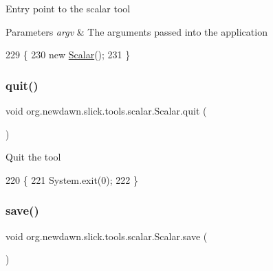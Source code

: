 Entry point to the scalar tool


\begin{DoxyParams}{Parameters}
{\em argv} & The arguments passed into the application \\
\hline
\end{DoxyParams}

\begin{DoxyCode}
229                                            \{
230         \textcolor{keyword}{new} \mbox{\hyperlink{classorg_1_1newdawn_1_1slick_1_1tools_1_1scalar_1_1_scalar_a9041a9bf0c10b24ed8d96c6acd056019}{Scalar}}();
231     \}
\end{DoxyCode}
\mbox{\label{classorg_1_1newdawn_1_1slick_1_1tools_1_1scalar_1_1_scalar_ae0f2111b7ad2a03db31292f6ad5f9502}} 
\subsubsection{\texorpdfstring{quit()}{quit()}}
{\footnotesize\ttfamily void org.\+newdawn.\+slick.\+tools.\+scalar.\+Scalar.\+quit (\begin{DoxyParamCaption}{ }\end{DoxyParamCaption})\hspace{0.3cm}{\ttfamily [inline]}}

Quit the tool 
\begin{DoxyCode}
220                        \{
221         System.exit(0);
222     \}
\end{DoxyCode}
\mbox{\label{classorg_1_1newdawn_1_1slick_1_1tools_1_1scalar_1_1_scalar_a68119c1aa5736c2a2f65ffe6f62f6ee9}} 
\subsubsection{\texorpdfstring{save()}{save()}}
{\footnotesize\ttfamily void org.\+newdawn.\+slick.\+tools.\+scalar.\+Scalar.\+save (\begin{DoxyParamCaption}{ }\end{DoxyParamCaption})\hspace{0.3cm}{\ttfamily [inline]}}

